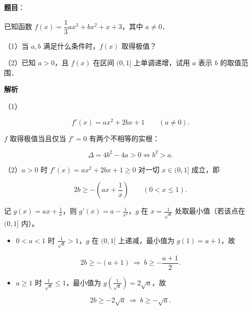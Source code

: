 \begin{answer}

\textbf{题目}：

已知函数 $f(x)=\dfrac13ax^3+bx^2+x+3$，其中 $a\neq0$．

（1）当 $a,b$ 满足什么条件时，$f(x)$ 取得极值？

（2）已知 $a>0$，且 $f(x)$ 在区间 $(0,1]$ 上单调递增，试用 $a$ 表示 $b$ 的取值范围．

\textbf{解析}

（1）

\nopagebreak[4]
\[f'(x)=ax^2+2bx+1\qquad(a\neq0).\]

$f$ 取得极值当且仅当 $f'=0$ 有两个不相等的实根：

\nopagebreak[4]
\[\Delta=4b^2-4a>0\iff b^2>a .\]

（2）$a>0$ 时 $f'(x)=ax^2+2bx+1\geqslant0$ 对一切 $x\in(0,1]$ 成立，即

\nopagebreak[4]
\[2b\geqslant-\left(ax+\frac1x\right)\qquad(0<x\leqslant1).\]

记 $g(x)=ax+\frac1x$，则 $g'(x)=a-\frac1{x^2}$，$g$ 在 $x=\frac1{\sqrt a}$ 处取最小值（若该点在 $(0,1]$ 内）。

\begin{itemize}
\item $0<a<1$ 时 $\frac1{\sqrt a}>1$，$g$ 在 $(0,1]$ 上递减，最小值为 $g(1)=a+1$，故
\end{itemize}

\nopagebreak[4]
\[2b\geqslant-(a+1)\ \Longrightarrow\ b\geqslant-\frac{a+1}{2}.\]

\begin{itemize}
\item $a\geqslant1$ 时 $\frac1{\sqrt a}\leqslant1$，最小值为 $g\left(\frac1{\sqrt a}\right)=2\sqrt a$，故
\end{itemize}

\nopagebreak[4]
\[2b\geqslant-2\sqrt a\ \Longrightarrow\ b\geqslant-\sqrt a .\]


\end{answer}
